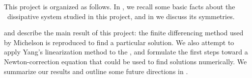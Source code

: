 

This project is organized as follows.
In , we recall some basic facts about the \KS\ dissipative
system studied in this project, and in
 we discuss its symmetries.

 and  describe the main
result of this project: the finite differencing method used by
Michelson is reproduced to find a particular solution. We also
attempt to apply Yang's linearization method to the \KSe, and formulate the
first steps toward a Newton-correction equation that could be used to find
solutions numerically.
We summarize our results and outline some future directions in
.
